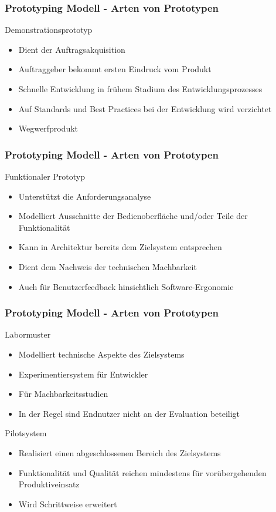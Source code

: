 \begin{frame}
\frametitle{Prototyping Modell - Arten von Prototypen}
	Demonstrationsprototyp
	\begin{itemize}
		\item Dient der Auftragsakquisition
		\item Auftraggeber bekommt ersten Eindruck vom Produkt
		\item Schnelle Entwicklung in frühem Stadium des Entwicklungsprozesses
		\item Auf Standards und Best Practices bei der Entwicklung wird verzichtet
		\item Wegwerfprodukt
	\end{itemize}
\end{frame}

\begin{frame}
\frametitle{Prototyping Modell - Arten von Prototypen}
	Funktionaler Prototyp
	\begin{itemize}
		\item Unterstützt die Anforderungsanalyse
		\item Modelliert Ausschnitte der Bedienoberfläche und/oder Teile der Funktionalität
		\item Kann in Architektur bereits dem Zielsystem entsprechen
		\item Dient dem Nachweis der technischen Machbarkeit
		\item Auch für Benutzerfeedback hinsichtlich Software-Ergonomie
	\end{itemize}
\end{frame}

\begin{frame}
\frametitle{Prototyping Modell - Arten von Prototypen}
	Labormuster
	\begin{itemize}
		\item Modelliert technische Aspekte des Zielsystems
		\item Experimentiersystem für Entwickler
		\item Für Machbarkeitsstudien
		\item In der Regel sind Endnutzer nicht an der Evaluation beteiligt
	\end{itemize}
	\bigskip
	Pilotsystem
	\begin{itemize}
		\item Realisiert einen abgeschlossenen Bereich des Zielsystems
		\item Funktionalität und Qualität reichen mindestens für vorübergehenden 
		Produktiveinsatz
		\item Wird Schrittweise erweitert
	\end{itemize}
\end{frame}

